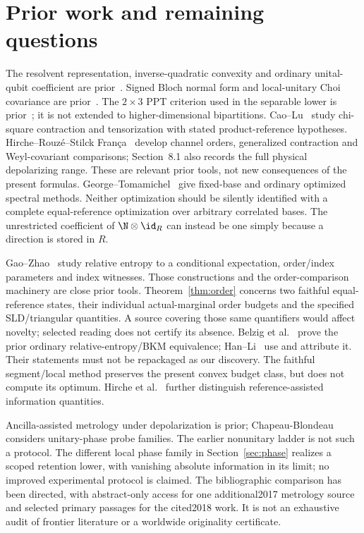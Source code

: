 \section{Prior work and remaining questions}\label{sec:prior}
The resolvent representation, inverse-quadratic convexity and ordinary unital-qubit coefficient are prior~\cite{HR}. Signed Bloch normal form and local-unitary Choi covariance are prior~\cite{RSW}. The \(2\times3\) PPT criterion used in the separable lower is prior~\cite{HHH}; it is not extended to higher-dimensional bipartitions.
Cao--Lu~\cite{CL} study chi-square contraction and tensorization with stated product-reference hypotheses. Hirche--Rouz\'e--Stilck Fran\c{c}a~\cite{HRF} develop channel orders, generalized contraction and Weyl-covariant comparisons; Section~8.1 also records the full physical depolarizing range. These are relevant prior tools, not new consequences of the present formulas. George--Tomamichel~\cite{GT} give fixed-base and ordinary optimized spectral methods. Neither optimization should be silently identified with a complete equal-reference optimization over arbitrary correlated bases. The unrestricted coefficient of \(\N\otimes\id_R\) can instead be one simply because a direction is stored in \(R\).

Gao--Zhao~\cite{GZ} study relative entropy to a conditional expectation, order/index parameters and index witnesses. Those constructions and the order-comparison machinery are close prior tools. Theorem~\ref{thm:order} concerns two faithful equal-reference states, their individual actual-marginal order budgets and the specified SLD/triangular quantities. A source covering those same quantifiers would affect novelty; selected reading does not certify its absence. Belzig et al.~\cite[Section~4.1, Lemma~4.1]{Reverse} prove the prior ordinary relative-entropy/BKM equivalence; Han--Li~\cite[Section~2.2, Lemma~1]{HanLi} use and attribute it. Their statements must not be repackaged as our discovery. The faithful segment/local method preserves the present convex budget class, but does not compute its optimum. Hirche et al.~\cite{Conditional} further distinguish reference-assisted information quantities.

Ancilla-assisted metrology under depolarization is prior; Chapeau-Blondeau~\cite{CB} considers unitary-phase probe families. The earlier nonunitary ladder is not such a protocol. The different local phase family in Section~\ref{sec:phase} realizes a scoped retention lower, with vanishing absolute information in its limit; no improved experimental protocol is claimed. The bibliographic comparison has been directed, with abstract-only access for one additional2017 metrology source and selected primary passages for the cited2018 work. It is not an exhaustive audit of frontier literature or a worldwide originality certificate.

